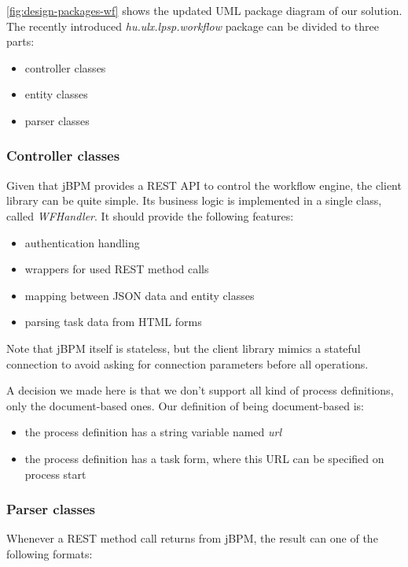 \autoref{fig:design-packages-wf} shows the updated UML package diagram of our
solution. The recently introduced \emph{hu.ulx.lpsp.workflow} package can be divided to three
parts:

\begin{itemize}
\item controller classes
\item entity classes
\item parser classes
\end{itemize}

\subsubsection*{Controller classes}

Given that jBPM provides a REST API to control the workflow engine, the client
library can be quite simple. Its business logic is implemented in a single
class, called \emph{WFHandler}. It should provide the following features:

\begin{itemize}
\item authentication handling
\item wrappers for used REST method calls
\item mapping between JSON data and entity classes
\item parsing task data from HTML forms
\end{itemize}

Note that jBPM itself is stateless, but the client library mimics a stateful
connection to avoid asking for connection parameters before all operations.

A decision we made here is that we don't support all kind of process
definitions, only the document-based ones. Our definition of being
document-based is:

\begin{itemize}
\item the process definition has a string variable named \emph{url}
\item the process definition has a task form, where this URL can be specified on process start
\end{itemize}

\subsubsection*{Parser classes}

Whenever a REST method call returns from jBPM, the result can one of the following formats:

